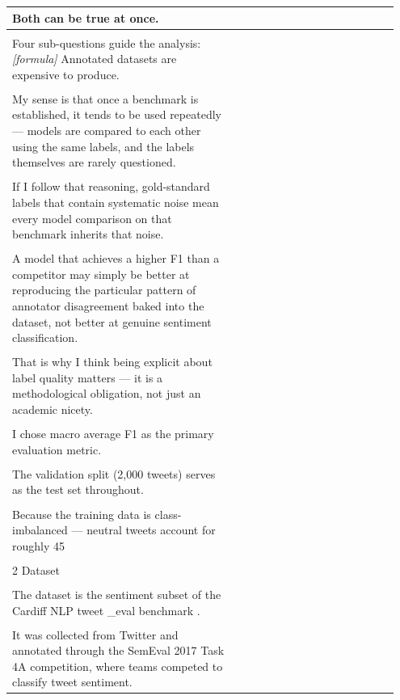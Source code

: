 \documentclass[11pt]{article}
\begin{document}
\begin{longtable}{|p{0.55\linewidth}|p{0.40\linewidth}|}
\hline
Both can be true at once. & \\[2pt]
\hline
\rule{0pt}{3.5cm} & \\
\hline
Four sub-questions guide the analysis: \textit{[formula]} Annotated datasets are expensive to produce. & \\[2pt]
\hline
\rule{0pt}{3.5cm} & \\
\hline
My sense is that once a benchmark is established, it tends to be used repeatedly --- models are compared to each other using the same labels, and the labels themselves are rarely questioned. & \\[2pt]
\hline
\rule{0pt}{3.5cm} & \\
\hline
If I follow that reasoning, gold-standard labels that contain systematic noise mean every model comparison on that benchmark inherits that noise. & \\[2pt]
\hline
\rule{0pt}{3.5cm} & \\
\hline
A model that achieves a higher F1 than a competitor may simply be better at reproducing the particular pattern of annotator disagreement baked into the dataset, not better at genuine sentiment classification. & \\[2pt]
\hline
\rule{0pt}{3.5cm} & \\
\hline
That is why I think being explicit about label quality matters --- it is a methodological obligation, not just an academic nicety. & \\[2pt]
\hline
\rule{0pt}{3.5cm} & \\
\hline
I chose macro average F1 as the primary evaluation metric. & \\[2pt]
\hline
\rule{0pt}{3.5cm} & \\
\hline
The validation split (2,000 tweets) serves as the test set throughout. & \\[2pt]
\hline
\rule{0pt}{3.5cm} & \\
\hline
Because the training data is class-imbalanced --- neutral tweets account for roughly 45 & \\[2pt]
\hline
\rule{0pt}{3.5cm} & \\
\hline
2 Dataset & \\[2pt]
\hline
\rule{0pt}{3.5cm} & \\
\hline
The dataset is the sentiment subset of the Cardiff NLP tweet \_eval benchmark . & \\[2pt]
\hline
\rule{0pt}{3.5cm} & \\
\hline
It was collected from Twitter and annotated through the SemEval 2017 Task 4A competition, where teams competed to classify tweet sentiment. & \\[2pt]

\end{longtable}
\end{document}
